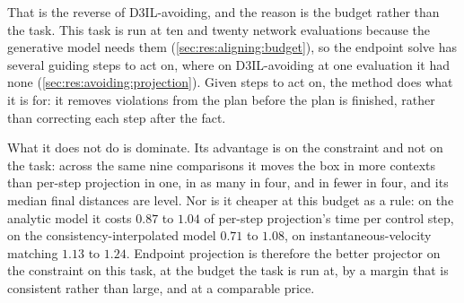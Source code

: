 That is the reverse of D3IL-avoiding, and the reason is the budget rather than the task. This task is
run at ten and twenty network evaluations because the generative model needs them
(\autoref{sec:res:aligning:budget}), so the endpoint solve has several guiding steps to act on, where on
D3IL-avoiding at one evaluation it had none (\autoref{sec:res:avoiding:projection}). Given steps to act
on, the method does what it is for: it removes violations from the plan before the plan is finished,
rather than correcting each step after the fact.

What it does not do is dominate. Its advantage is on the constraint and not on the task: across the same
nine comparisons it moves the box in more contexts than per-step projection in one, in as many in four,
and in fewer in four, and its median final distances are level. Nor is it cheaper at this budget as a
rule: on the analytic model it costs $0.87$ to $1.04$ of per-step projection's time per control step, on
the consistency-interpolated model $0.71$ to $1.08$, on instantaneous-velocity matching $1.13$ to $1.24$.
Endpoint projection is therefore the better projector on the constraint on this task, at the budget the
task is run at, by a margin that is consistent rather than large, and at a comparable price.


